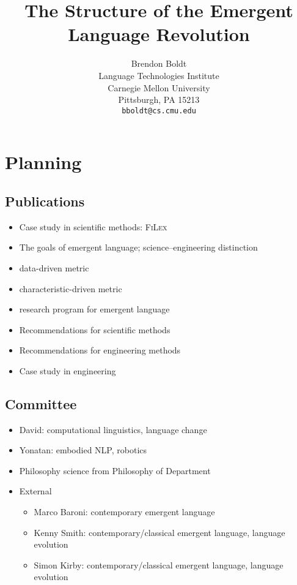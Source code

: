 \documentclass[letterpaper]{report}
\title{The Structure of the Emergent Language Revolution}
\author{%
  Brendon Boldt\\
  Language Technologies Institute\\
  Carnegie Mellon University\\
  Pittsburgh, PA 15213 \\
  \texttt{bboldt@cs.cmu.edu} \\
}
\begin{document}
\maketitle

\tableofcontents

\setcounter{chapter}{-1}
\chapter{Planning}

\section{Publications}
\begin{itemize}
    \item{}  Case study in scientific methods: \textsc{FiLex}
    \item{}  The goals of emergent language; science--engineering distinction
    \item{}   data-driven metric
    \item{}   characteristic-driven metric
    \item{}  research program for emergent language
    \item{}  Recommendations for scientific methods
    \item{}  Recommendations for engineering methods
    \item{}   Case study in engineering
\end{itemize}

\section{Committee}
\begin{itemize}
    \item David: computational linguistics, language change
    \item Yonatan: embodied NLP, robotics
    \item {} Philosophy science from Philosophy of Department
    \item {} External
        \begin{itemize}
        \item Marco Baroni: contemporary emergent language
        \item Kenny Smith: contemporary/classical emergent language, language evolution
        \item Simon Kirby: contemporary/classical emergent language, language evolution
        \end{itemize}

\end{itemize}
\end{document}
